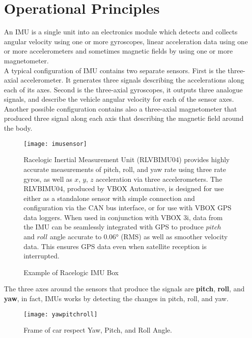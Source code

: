 \documentclass[tesi]{subfiles}
\begin{document}
\section{Operational Principles}\label{sc:Operational Principles}
An IMU is a single unit into an electronics module which detects and collects angular velocity using one or more gyroscopes, linear acceleration data using one or more accelerometers and sometimes magnetic fields by using one or more magnetometer.\\
A typical configuration of IMU contains two separate sensors. First is the three-axial accelerometer. It 
generates three signals describing the accelerations along each of its axes. Second is the three-axial gyroscopes, it  outputs three analogue signals, and describe the vehicle angular velocity for each of the sensor axes. Another possible configuration contains also a three-axial magnetometer that produced three signal along each axis that describing the magnetic field around the body.
\begin{center}
\begin{figure}[H]
\centering
\texttt{[image: imusensor]}
\begin{center}
\begin{small}
Racelogic Inertial Measurement Unit (RLVBIMU04) provides highly accurate measurements of pitch, roll, and yaw rate using three rate gyros, as well as $x$, $y$, $z$ acceleration via three accelerometers. 
The RLVBIMU04, produced by VBOX Automative, is designed for use either as a standalone sensor with simple connection and configuration via the CAN bus interface, or for use with VBOX GPS data loggers.
When used in conjunction with VBOX 3i, data from the IMU can be seamlessly integrated with GPS to produce $pitch$ and $roll$ angle accurate to $0.06\si{\degree}$ (RMS) as well as smoother velocity data. This ensures GPS data even when satellite reception is interrupted.
\end{small}
\end{center}
\caption{Example of Racelogic IMU Box}
\label{fig:IMU box}
\end{figure}
\end{center}



\noindent The three axes around the sensors that produce the signals are \textbf{pitch}, \textbf{roll}, and \textbf{yaw}, in fact, IMUs works by detecting the changes in pitch, roll, and yaw.

\begin{center}
\begin{figure}[h]
\centering
\label{fig:Yaw Roll Pitch Frame of car}
\texttt{[image: yawpitchroll]}
\caption{Frame of car respect Yaw, Pitch, and Roll Angle.}
\end{figure}
\end{center}
\end{document}
